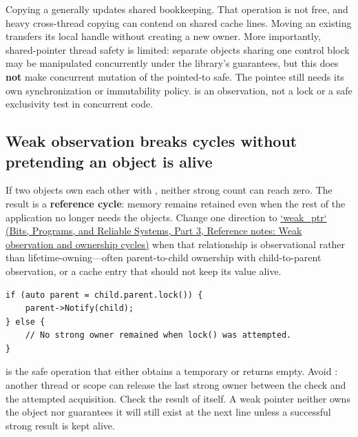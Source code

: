Copying a  generally updates shared bookkeeping. That operation is not free, and heavy cross-thread copying can contend on shared cache lines. Moving an existing  transfers its local handle without creating a new owner. More importantly, shared-pointer thread safety is limited: separate  objects sharing one control block may be manipulated concurrently under the library's guarantees, but this does \textbf{not} make concurrent mutation of the pointed-to  safe. The pointee still needs its own synchronization or immutability policy.  is an observation, not a lock or a safe exclusivity test in concurrent code.

\subsection{Weak observation breaks cycles without pretending an object is alive}\label{05-engine-i-ch004-weak-observation-breaks-cycles-without-pretending-an-object-is-alive}

\hypertarget{05-engine-i-ch004-weak-observation-breaks-cycles-without-pretending-an-object-is-alive}{}

If two objects own each other with , neither strong count can reach zero. The result is a \textbf{reference cycle}: memory remains retained even when the rest of the application no longer needs the objects. Change one direction to \href{../01-Bits-Programs-and-Reliable-Systems-P03/main.pdf\#nameddest=appendix-b9548675eb2b}{`weak\_ptr` (Bits, Programs, and Reliable Systems, Part 3, Reference notes: Weak observation and ownership cycles)} when that relationship is observational rather than lifetime-owning---often parent-to-child ownership with child-to-parent observation, or a cache entry that should not keep its value alive.

\begin{verbatim}
if (auto parent = child.parent.lock()) {
    parent->Notify(child);
} else {
    // No strong owner remained when lock() was attempted.
}
\end{verbatim}

 is the safe operation that either obtains a temporary  or returns empty. Avoid : another thread or scope can release the last strong owner between the check and the attempted acquisition. Check the result of  itself. A weak pointer neither owns the object nor guarantees it will still exist at the next line unless a successful strong result is kept alive.

